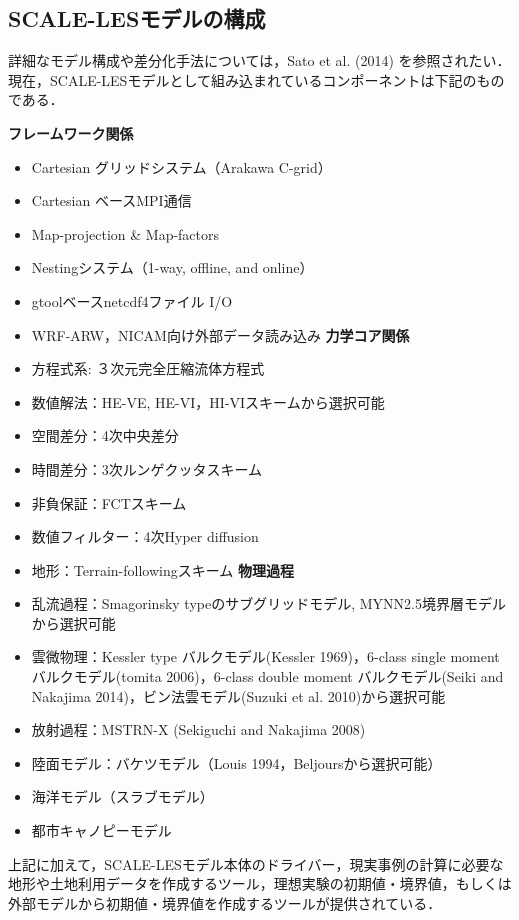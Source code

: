 \subsection{SCALE-LESモデルの構成}
詳細なモデル構成や差分化手法については，Sato et al. (2014) を参照されたい．現在，SCALE-LESモデルとして組み込まれているコンポーネントは下記のものである．

{\bf フレームワーク関係}
\begin{itemize}
\item Cartesian グリッドシステム（Arakawa C-grid）
\item Cartesian ベースMPI通信
\item Map-projection \& Map-factors
\item Nestingシステム（1-way, offline, and online）
\item gtoolベースnetcdf4ファイル I/O
\item WRF-ARW，NICAM向け外部データ読み込み
{\bf 力学コア関係}
\item 方程式系: ３次元完全圧縮流体方程式
\item 数値解法：HE-VE,  HE-VI，HI-VIスキームから選択可能
\item 空間差分：4次中央差分
\item 時間差分：3次ルンゲクッタスキーム
\item 非負保証：FCTスキーム
\item 数値フィルター：4次Hyper diffusion
\item 地形：Terrain-followingスキーム
{\bf 物理過程}
\item 乱流過程：Smagorinsky typeのサブグリッドモデル, MYNN2.5境界層モデルから選択可能
\item 雲微物理：Kessler type バルクモデル(Kessler 1969)，6-class single moment バルクモデル(tomita 2006)，6-class double moment バルクモデル(Seiki and Nakajima 2014)，ビン法雲モデル(Suzuki et al. 2010)から選択可能
\item 放射過程：MSTRN-X (Sekiguchi and Nakajima 2008)
\item 陸面モデル：バケツモデル（Louis 1994，Beljoursから選択可能）
\item 海洋モデル（スラブモデル）
\item 都市キャノピーモデル
\end{itemize}

上記に加えて，SCALE-LESモデル本体のドライバー，現実事例の計算に必要な地形や土地利用データを作成するツール，理想実験の初期値・境界値，もしくは外部モデルから初期値・境界値を作成するツールが提供されている．


